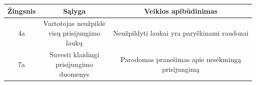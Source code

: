 \documentclass[12pt]{article}
\begin{document}
\begin{enumerate}
		\begin{center}
		\begin{tabular}{ | c | c | c | }
			\hline
			Žingsnis & Sąlyga                                     & Veiklos apibūdinimas \\ \hline
			4a       & \makecell{Vartotojas neužpildė \\ visų prisijungimo laukų} & Neužpildyti laukai yra paryškinami raudonai \\ \hline
			7a       & \makecell{Suvesti klaidingi \\ prisijungimo duomenys} & Parodomas pranešimas apie nesėkmingą prisijungimą \\ \hline
		\end{tabular}
		\end{center}
		
	\end{enumerate}	
	\pagebreak
	
\end{document}
